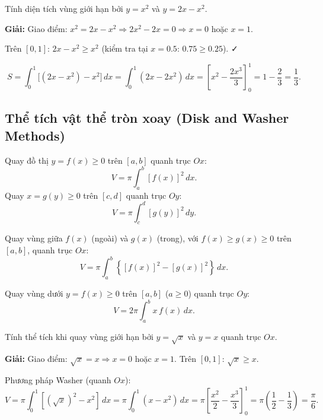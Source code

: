 \documentclass[12pt,a4paper]{article}
\begin{document}
\begin{vidu}
  Tính diện tích vùng giới hạn bởi $y = x^2$ và $y = 2x - x^2$.

  \medskip\textbf{Giải:}
  Giao điểm: $x^2 = 2x - x^2 \Rightarrow 2x^2 - 2x = 0 \Rightarrow x = 0$ hoặc $x = 1$.

  Trên $[0,1]$: $2x - x^2 \ge x^2$ (kiểm tra tại $x = 0.5$: $0.75 \ge 0.25$). ✓

  \[
    S = \int_0^1 \bigl[(2x - x^2) - x^2\bigr]\,dx = \int_0^1 (2x - 2x^2)\,dx
    = \left[x^2 - \frac{2x^3}{3}\right]_0^1 = 1 - \frac{2}{3} = \frac{1}{3}.
  \]
\end{vidu}

\subsection{Thể tích vật thể tròn xoay (Disk and Washer Methods)}

\begin{congthuc}[title={Phương pháp đĩa (Disk Method)}]
  Quay đồ thị $y = f(x) \ge 0$ trên $[a,b]$ quanh trục $Ox$:
  \[
    V = \pi \int_a^b [f(x)]^2\,dx.
  \]
  Quay $x = g(y) \ge 0$ trên $[c,d]$ quanh trục $Oy$:
  \[
    V = \pi \int_c^d [g(y)]^2\,dy.
  \]
\end{congthuc}

\begin{congthuc}[title={Phương pháp vòng đệm (Washer Method)}]
  Quay vùng giữa $f(x)$ (ngoài) và $g(x)$ (trong), với $f(x) \ge g(x) \ge 0$ trên $[a,b]$, quanh trục $Ox$:
  \[
    V = \pi \int_a^b \left\{[f(x)]^2 - [g(x)]^2\right\}\,dx.
  \]
\end{congthuc}

\begin{congthuc}[title={Phương pháp vỏ trụ (Shell Method)}]
  Quay vùng dưới $y = f(x) \ge 0$ trên $[a,b]$ ($a \ge 0$) quanh trục $Oy$:
  \[
    V = 2\pi \int_a^b x\,f(x)\,dx.
  \]
\end{congthuc}

\begin{vidu}
  Tính thể tích khi quay vùng giới hạn bởi $y = \sqrt{x}$ và $y = x$ quanh trục $Ox$.

  \medskip\textbf{Giải:}
  Giao điểm: $\sqrt{x} = x \Rightarrow x = 0$ hoặc $x = 1$. Trên $[0,1]$: $\sqrt{x} \ge x$.

  Phương pháp Washer (quanh $Ox$):
  \[
    V = \pi \int_0^1 \left[(\sqrt{x})^2 - x^2\right]\,dx
    = \pi \int_0^1 (x - x^2)\,dx
    = \pi \left[\frac{x^2}{2} - \frac{x^3}{3}\right]_0^1
    = \pi\left(\frac{1}{2} - \frac{1}{3}\right) = \frac{\pi}{6}.
  \]
\end{vidu}
\end{document}
